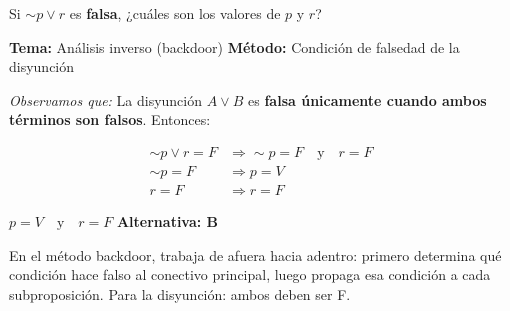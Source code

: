 \begin{tcolorbox}[
  enhanced, breakable,
  colback=GrisClaro, colframe=AzulPizarra,
  fonttitle=\bfseries\sffamily,
  title={Ejercicio 7 — Valores de verdad de $\sim p \vee r$ falsa},
  arc=3pt, boxrule=0.8pt
]

\begin{problema}
Si $\sim p \vee r$ es \textbf{falsa}, ¿cuáles son los valores de $p$ y $r$?
\end{problema}

\smallskip
\noindent
\textbf{\sffamily\color{AzulMedio}Tema:} Análisis inverso (backdoor) \hfill
\textbf{\sffamily\color{AzulMedio}Método:} Condición de falsedad de la disyunción

\medskip
\noindent\textit{Observamos que:} La disyunción $A \vee B$ es \textbf{falsa únicamente cuando ambos términos son falsos}. Entonces:

\begin{align*}
  \sim p \vee r = F &\Rightarrow \sim p = F \quad \text{y} \quad r = F \\
  \sim p = F        &\Rightarrow p = V \\
  r = F             &\Rightarrow r = F
\end{align*}

\begin{tcolorbox}[colback=AzulClaro!60, colframe=AzulPizarra, arc=2pt, boxrule=0.8pt, left=8pt, right=8pt]
\centering
$\displaystyle \boxed{p = V \quad \text{y} \quad r = F}$ \quad \textbf{Alternativa: B}
\end{tcolorbox}

\begin{cajatip}
En el método backdoor, trabaja de afuera hacia adentro: primero determina qué condición hace falso al conectivo principal, luego propaga esa condición a cada subproposición. Para la disyunción: ambos deben ser F.
\end{cajatip}
\end{tcolorbox}

\vspace{0.5cm}

